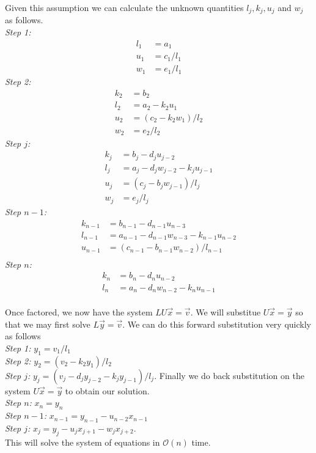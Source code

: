 \documentclass[12pt]{article}
\begin{document}
	Given this assumption we can calculate the unknown quantities $l_j, k_j, u_j$ and $w_j$ as follows. \\
	\emph{Step 1:} 
	\begin{align*}
		l_1 &= a_1 \\
		u_1 &= c_1/l_1 \\
		w_1 & = e_1/l_1
	\end{align*}
	\emph{Step 2:} 
	\begin{align*}
		k_2 &= b_2 \\
		l_2 &= a_2 - k_2u_1 \\
		u_2 &= (c_2 - k_2w_1)/l_2 \\
		w_2 & = e_2/l_2
	\end{align*}
	\emph{Step $j$:} 
	\begin{align*}
		k_j &= b_j - d_ju_{j-2} \\
		l_j &= a_j - d_jw_{j-2} - k_ju_{j-1} \\
		u_j &= (c_j - b_jw_{j-1})/l_j \\
		w_j & = e_j/l_j
	\end{align*}
	\emph{Step $n-1$:} 
	\begin{align*}
		k_{n-1} &= b_{n-1} - d_{n-1}u_{n-3} \\
		l_{n-1} &= a_{n-1} - d_{n-1}w_{n-3} - k_{n-1}u_{n-2} \\
		u_{n-1} &= (c_{n-1} - b_{n-1}w_{n-2})/l_{n-1} \\
	\end{align*}
	\emph{Step $n$:} 
	\begin{align*}
		k_n &= b_n - d_nu_{n-2} \\
		l_n &= a_n - d_nw_{n-2} - k_nu_{n-1} \\
	\end{align*}
	
	Once factored, we now have the system $LU\vec{x}=\vec{v}$. We will substitue $U\vec{x}=\vec{y}$ so that we may first solve $L\vec{y}=\vec{v}$. We can do this forward substitution very quickly as follows\\
	\emph{Step 1:} $y_1 = v_1/l_1$ \\
	\emph{Step 2:} $y_2 = (v_2-k_2y_1)/l_2$ \\
	\emph{Step $j$:} $y_j = (v_j - d_jy_{j-2} - k_jy_{j-1})/l_j$.
	Finally we do back substitution on the system $U\vec{x}= \vec{y}$ to obtain our solution.\\
	\emph{Step $n$:} $x_n = y_n$ \\
	\emph{Step $n-1$:} $x_{n-1} = y_{n-1} - u_{n-2}x_{n-1}$ \\
	\emph{Step $j$:} $x_j = y_j - u_jx_{j+1} - w_jx_{j+2}$. \\
	This will solve the system of equations in $\mathcal{O}(n)$ time.
	
\end{document}
